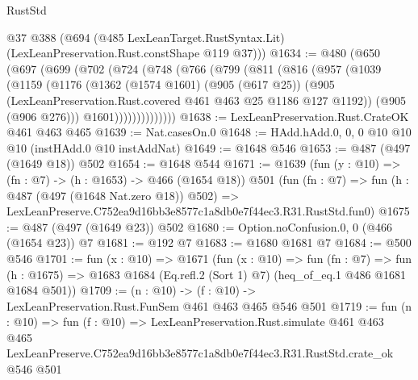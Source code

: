 \begin{lexlean}{RustStd}
\begin{coremodule}
      @37
      @388
      (@694 (@485 LexLeanTarget.RustSyntax.Lit) (LexLeanPreservation.Rust.constShape @119 @37)))
@1634 := @480
    (@650
      (@697
        (@699
          (@702
            (@724
              (@748
                (@766
                  (@799
                    (@811
                      (@816
                        (@957
                          (@1039
                            (@1159
                              (@1176
                                (@1362
                                  (@1574 @1601)
                                  (@905 (@617 @25))
                                  (@905
                                    (LexLeanPreservation.Rust.covered
                                      @461
                                      @463
                                      @25
                                      @1186
                                      @127
                                      @1192))
                                  (@905 (@906 @276)))
                                @1601))))))))))))))
@1638 := LexLeanPreservation.Rust.CrateOK @461 @463 @465
@1639 := Nat.casesOn.{0}
@1648 := HAdd.hAdd.{0, 0, 0} @10 @10 @10 (instHAdd.{0} @10 instAddNat)
@1649 := @1648 @546
@1653 := @487 (@497 (@1649 @18)) @502
@1654 := @1648 @544
@1671 := @1639
    (fun (y : @10) => (fn : @7) -> (h : @1653) -> @466 (@1654 @18))
    @501
    (fun (fn : @7) =>
    fun (h : @487 (@497 (@1648 Nat.zero @18)) @502) =>
    LexLeanPreserve.C752ea9d16bb3e8577c1a8db0e7f44ec3.R31.RustStd.fun0)
@1675 := @487 (@497 (@1649 @23)) @502
@1680 := Option.noConfusion.{0, 0} (@466 (@1654 @23)) @7
@1681 := @192 @7
@1683 := @1680 @1681 @7
@1684 := @500 @546
@1701 := fun (x : @10) =>
  @1671
    (fun (x : @10) =>
    fun (fn : @7) =>
    fun (h : @1675) => @1683 @1684 (Eq.refl.{2} (Sort 1) @7) (heq_of_eq.{1} @486 @1681 @1684 @501))
@1709 := (n : @10) -> (f : @10) -> LexLeanPreservation.Rust.FunSem @461 @463 @465 @546 @501
@1719 := fun (n : @10) =>
  fun (f : @10) =>
  LexLeanPreservation.Rust.simulate
    @461
    @463
    @465
    LexLeanPreserve.C752ea9d16bb3e8577c1a8db0e7f44ec3.R31.RustStd.crate_ok
    @546
    @501
\end{coremodule}
\end{lexlean}
